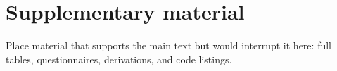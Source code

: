 \chapter{Supplementary material}
Place material that supports the main text but would interrupt it here: full tables, questionnaires, derivations, and code listings.


